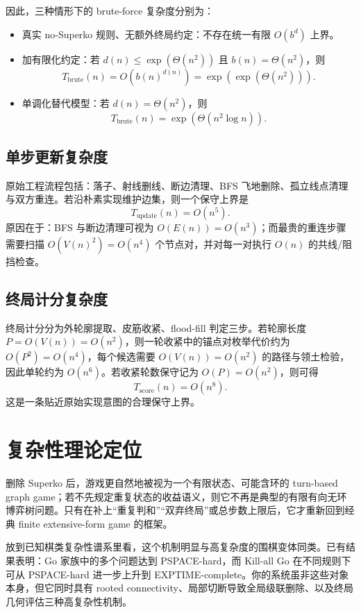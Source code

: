 \documentclass[12pt]{ctexart}
\begin{document}
因此，三种情形下的 brute-force 复杂度分别为：

\begin{itemize}
\item 真实 no-Superko 规则、无额外终局约定：不存在统一有限 \(O(b^d)\) 上界。
\item 加有限化约定：若 \(d(n)\le \exp(\Theta(n^2))\) 且 \(b(n)=\Theta(n^2)\)，则
\[
T_{\mathrm{brute}}(n)=O(b(n)^{d(n)})=\exp(\exp(\Theta(n^2))).
\]
\item 单调化替代模型：若 \(d(n)=\Theta(n^2)\)，则
\[
T_{\mathrm{brute}}(n)=\exp(\Theta(n^2\log n)).
\]
\end{itemize}

\subsection*{单步更新复杂度}

原始工程流程包括：落子、射线删线、断边清理、BFS 飞地删除、孤立线点清理与双方重连。若沿朴素实现维护边集，则一个保守上界是
\[
T_{\mathrm{update}}(n)=O(n^5).
\]
原因在于：BFS 与断边清理可视为 \(O(E(n))=O(n^3)\)；而最贵的重连步骤需要扫描 \(O(V(n)^2)=O(n^4)\) 个节点对，并对每一对执行 \(O(n)\) 的共线/阻挡检查。

\subsection*{终局计分复杂度}

终局计分分为外轮廓提取、皮筋收紧、flood-fill 判定三步。若轮廓长度 \(P=O(V(n))=O(n^2)\)，则一轮收紧中的锚点对枚举代价约为 \(O(P^2)=O(n^4)\)，每个候选需要 \(O(V(n))=O(n^2)\) 的路径与领土检验，因此单轮约为 \(O(n^6)\)。若收紧轮数保守记为 \(O(P)=O(n^2)\)，则可得
\[
T_{\mathrm{score}}(n)=O(n^8).
\]
这是一条贴近原始实现意图的合理保守上界。

\section*{复杂性理论定位}

删除 Superko 后，游戏更自然地被视为一个有限状态、可能含环的 turn-based graph game；若不先规定重复状态的收益语义，则它不再是典型的有限有向无环博弈树问题。只有在补上“重复判和”“双弃终局”或总步数上限后，它才重新回到经典 finite extensive-form game 的框架。

放到已知棋类复杂性谱系里看，这个机制明显与高复杂度的围棋变体同类。已有结果表明：Go 家族中的多个问题达到 PSPACE-hard，而 Kill-all Go 在不同规则下可从 PSPACE-hard 进一步上升到 EXPTIME-complete。你的系统虽非这些对象本身，但它同时具有 rooted connectivity、局部切断导致全局级联删除、以及终局几何评估三种高复杂性机制。
\end{document}
